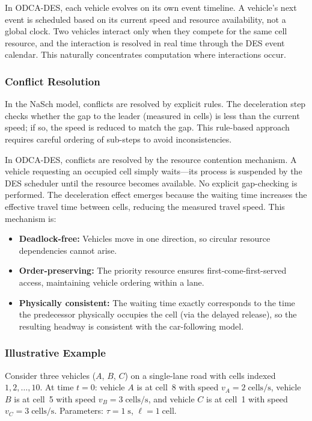 \documentclass[review,authoryear]{elsarticle}
\begin{document}
In ODCA-DES, each vehicle evolves on its own event timeline. A vehicle's next event is scheduled based on its current speed and resource availability, not a global clock. Two vehicles interact only when they compete for the same cell resource, and the interaction is resolved in real time through the DES event calendar. This naturally concentrates computation where interactions occur.

\subsubsection{Conflict Resolution}

In the NaSch model, conflicts are resolved by explicit rules. The deceleration step checks whether the gap to the leader (measured in cells) is less than the current speed; if so, the speed is reduced to match the gap. This rule-based approach requires careful ordering of sub-steps to avoid inconsistencies.

In ODCA-DES, conflicts are resolved by the resource contention mechanism. A vehicle requesting an occupied cell simply waits---its process is suspended by the DES scheduler until the resource becomes available. No explicit gap-checking is performed. The deceleration effect emerges because the waiting time increases the effective travel time between cells, reducing the measured travel speed. This mechanism is:
\begin{itemize}
    \item \textbf{Deadlock-free:} Vehicles move in one direction, so circular resource dependencies cannot arise.
    \item \textbf{Order-preserving:} The priority resource ensures first-come-first-served access, maintaining vehicle ordering within a lane.
    \item \textbf{Physically consistent:} The waiting time exactly corresponds to the time the predecessor physically occupies the cell (via the delayed release), so the resulting headway is consistent with the car-following model.
\end{itemize}

\subsubsection{Illustrative Example}
\label{sec:example}

Consider three vehicles ($A$, $B$, $C$) on a single-lane road with cells indexed $1, 2, \ldots, 10$. At time $t=0$: vehicle $A$ is at cell~8 with speed $v_A = 2\;\text{cells/s}$, vehicle $B$ is at cell~5 with speed $v_B = 3\;\text{cells/s}$, and vehicle $C$ is at cell~1 with speed $v_C = 3\;\text{cells/s}$. Parameters: $\tau = 1\;\text{s}$, $\ell = 1\;\text{cell}$.
\end{document}
